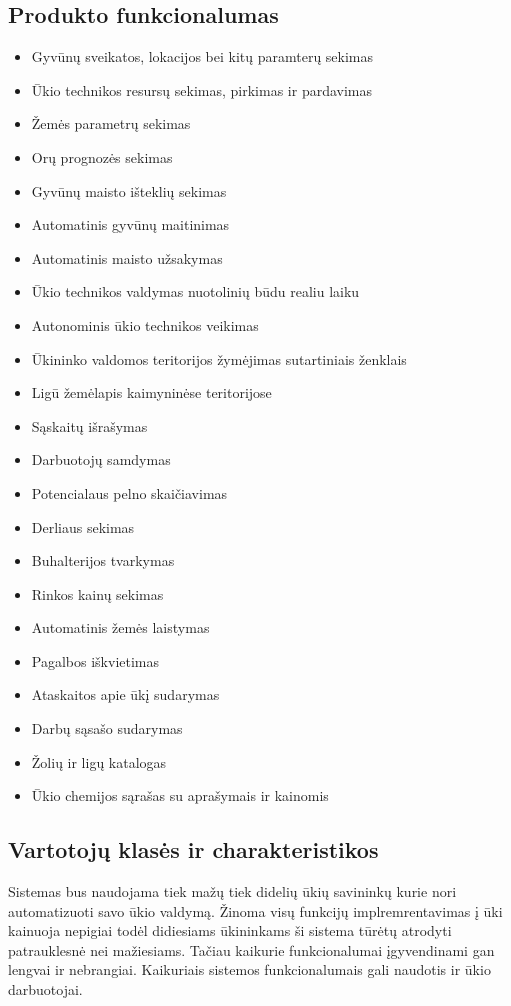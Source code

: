 \documentclass[oneside]{VUMIFPSkursinis}
\begin{document}
\subsection{Produkto funkcionalumas}
\begin{itemize}
	\item Gyvūnų sveikatos, lokacijos bei kitų paramterų sekimas
	\item Ūkio technikos resursų sekimas, pirkimas ir pardavimas
	\item Žemės parametrų sekimas
	\item Orų prognozės sekimas
	\item Gyvūnų maisto išteklių sekimas
	\item Automatinis gyvūnų maitinimas
	\item Automatinis maisto užsakymas
	\item Ūkio technikos valdymas nuotolinių būdu realiu laiku
	\item Autonominis ūkio technikos veikimas
	\item Ūkininko valdomos teritorijos žymėjimas sutartiniais ženklais
	\item Ligū žemėlapis kaimyninėse teritorijose
	\item Sąskaitų išrašymas
	\item Darbuotojų samdymas
	\item Potencialaus pelno skaičiavimas
	\item Derliaus sekimas
	\item Buhalterijos tvarkymas
	\item Rinkos kainų sekimas
	\item Automatinis žemės laistymas
	\item Pagalbos iškvietimas
	\item Ataskaitos apie ūkį sudarymas
	\item Darbų sąsašo sudarymas
	\item Žolių ir ligų katalogas
	\item Ūkio chemijos sąrašas su aprašymais ir kainomis
\end{itemize}
\subsection{Vartotojų klasės ir charakteristikos}
Sistemas bus naudojama tiek mažų tiek didelių ūkių savininkų kurie nori automatizuoti savo ūkio valdymą. Žinoma visų funkcijų implremrentavimas į ūki kainuoja nepigiai todėl didiesiams ūkininkams ši sistema tūrėtų atrodyti patrauklesnė nei mažiesiams. Tačiau kaikurie funkcionalumai įgyvendinami gan lengvai ir nebrangiai. Kaikuriais sistemos funkcionalumais gali naudotis ir ūkio darbuotojai.
\end{document}
